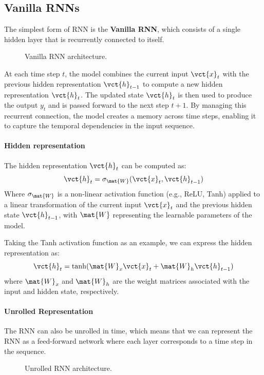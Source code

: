 \subsection{Vanilla RNNs}
The simplest form of RNN is the \textbf{Vanilla RNN}, which consists of a single hidden layer that is recurrently connected to itself.
\begin{figure}[H]
    \centering
    
    \caption{Vanilla RNN architecture.}
\end{figure}

At each time step $t$, the model combines the current input $\vct{x}_t$ with the previous hidden representation $\vct{h}_{t-1}$
to compute a new hidden representation $\vct{h}_t$.
The updated state $\vct{h}_t$ is then used to produce the output $y_t$ and is passed forward to the next step $t+1$.
By managing this recurrent connection, the model creates a memory across time steps, enabling it to capture the temporal dependencies in the input sequence.

\paragraph{Hidden representation}
The hidden representation $\vct{h}_t$ can be computed as:
\begin{equation}
    \vct{h}_t = \sigma_{\mat{W}}(\vct{x}_t, \vct{h}_{t-1})
\end{equation}
Where $\sigma_{\mat{W}}$ is a non-linear activation function (e.g., ReLU, Tanh) applied to a linear transformation of the current input $\vct{x}_t$ and the previous hidden state $\vct{h}_{t-1}$,
with $\mat{W}$ representing the learnable parameters of the model.

Taking the Tanh activation function as an example, we can express the hidden representation as:
\begin{equation}
    \vct{h}_t = \tanh(\mat{W}_{x} \vct{x}_t + \mat{W}_{h} \vct{h}_{t-1})
\end{equation}
where $\mat{W}_{x}$ and $\mat{W}_{h}$ are the weight matrices associated with the input and hidden state, respectively.

\paragraph{Unrolled Representation}
The RNN can also be unrolled in time, which means that we can represent the RNN as a feed-forward network where each layer corresponds to a time step in the sequence.
\begin{figure}[H]
    \centering
    \scalebox{0.8}{
        
    }
    \caption{Unrolled RNN architecture.}
\end{figure}

